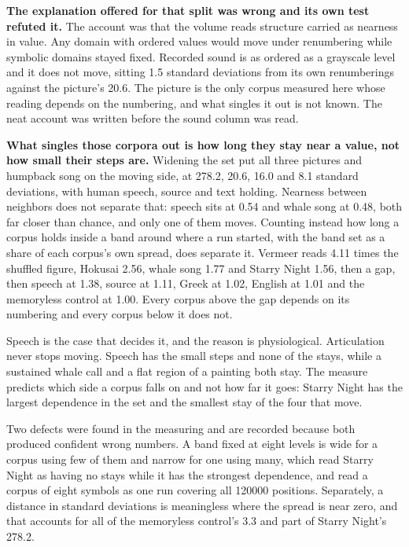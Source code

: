 \textbf{The explanation offered for that split was wrong and its own test refuted it.} The account was that the volume reads structure carried as nearness in value. Any domain with ordered values would move under renumbering while symbolic domains stayed fixed. Recorded sound is as ordered as a grayscale level and it does not move, sitting 1.5 standard deviations from its own renumberings against the picture's 20.6. The picture is the only corpus measured here whose reading depends on the numbering, and what singles it out is not known. The neat account was written before the sound column was read.

\textbf{What singles those corpora out is how long they stay near a value, not how small their steps are.} Widening the set put all three pictures and humpback song on the moving side, at 278.2, 20.6, 16.0 and 8.1 standard deviations, with human speech, source and text holding. Nearness between neighbors does not separate that: speech sits at 0.54 and whale song at 0.48, both far closer than chance, and only one of them moves. Counting instead how long a corpus holds inside a band around where a run started, with the band set as a share of each corpus's own spread, does separate it. Vermeer reads 4.11 times the shuffled figure, Hokusai 2.56, whale song 1.77 and Starry Night 1.56, then a gap, then speech at 1.38, source at 1.11, Greek at 1.02, English at 1.01 and the memoryless control at 1.00. Every corpus above the gap depends on its numbering and every corpus below it does not.

Speech is the case that decides it, and the reason is physiological. Articulation never stops moving. Speech has the small steps and none of the stays, while a sustained whale call and a flat region of a painting both stay. The measure predicts which side a corpus falls on and not how far it goes: Starry Night has the largest dependence in the set and the smallest stay of the four that move.

Two defects were found in the measuring and are recorded because both produced confident wrong numbers. A band fixed at eight levels is wide for a corpus using few of them and narrow for one using many, which read Starry Night as having no stays while it has the strongest dependence, and read a corpus of eight symbols as one run covering all 120000 positions. Separately, a distance in standard deviations is meaningless where the spread is near zero, and that accounts for all of the memoryless control's 3.3 and part of Starry Night's 278.2.

